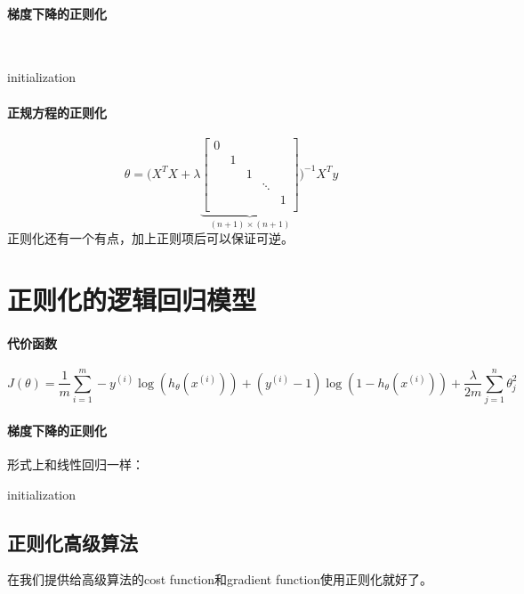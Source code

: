 \documentclass[../main.tex]{subfiles}
\begin{document}
\paragraph{梯度下降的正则化}~\\
\begin{algorithm}[H]
    initialization\;
\end{algorithm}

\paragraph{正规方程的正则化}
\[
    θ=\Bigg(X^TX  + λ\underbrace{\begin{bmatrix}
            0 &   &   &   &   \\
              & 1 &   &   &   \\
              &   & 1 &   &   \\
              &   &   & ⋱ &   \\
              &   &   &   & 1 \\
        \end{bmatrix}}_{(n+1)×(n+1)}\Bigg)^{-1}X^Ty
\]
正则化还有一个有点，加上正则项后可以保证可逆。

\section{正则化的逻辑回归模型}
\paragraph{代价函数}
\[
    J(θ) = \frac{1}{m}\sum\limits_{i=1}^{m}-y^{(i)}\log(h_θ(x^{(i)})) + (y^{(i)}-1)\log(1- h_θ(x^{(i)}))
    + \frac{λ}{2m}\sum\limits_{j=1}^{n}θ_j^2
\]

\paragraph{梯度下降的正则化}形式上和线性回归一样：\\
\begin{algorithm}[H]
    initialization\;
\end{algorithm}

\subsection{正则化高级算法}
在我们提供给高级算法的cost function和gradient function使用正则化就好了。
\end{document}
